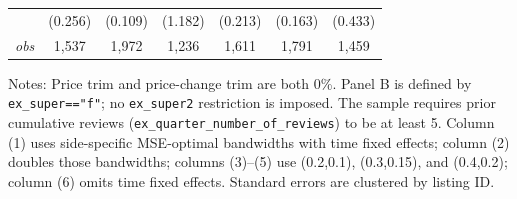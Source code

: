 \documentclass[11pt]{article}
\begin{document}
\begin{table}[!htbp]
\begin{tabular}{lcccccc}
 & (0.256) & (0.109) & (1.182) & (0.213) & (0.163) & (0.433) \\
\textit{obs} & 1,537 & 1,972 & 1,236 & 1,611 & 1,791 & 1,459 \\
\bottomrule
\end{tabular}
\begin{minipage}{0.98\textwidth}\footnotesize
Notes: Price trim and price-change trim are both 0\%. Panel B is defined by \texttt{ex\_super=="f"}; no \texttt{ex\_super2} restriction is imposed. The sample requires prior cumulative reviews (\texttt{ex\_quarter\_number\_of\_reviews}) to be at least 5. Column (1) uses side-specific MSE-optimal bandwidths with time fixed effects; column (2) doubles those bandwidths; columns (3)--(5) use (0.2,0.1), (0.3,0.15), and (0.4,0.2); column (6) omits time fixed effects. Standard errors are clustered by listing ID.
\end{minipage}
\end{table}
\end{document}

